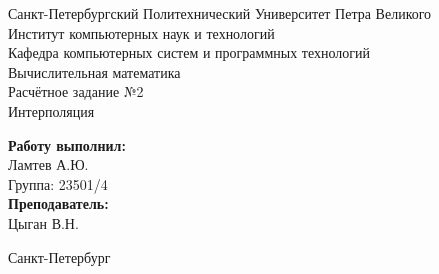 \begin{titlepage}	%

	\begin{center}		%

		\large Санкт-Петербургский Политехнический Университет Петра Великого\\
		\large Институт компьютерных наук и технологий \\
		\large Кафедра компьютерных систем и программных технологий\\[4cm]
		
		 \huge Вычислительная математика\\[0.3cm] %
		 \large Расчётное задание №2\\[0.1cm]
		 \large Интерполяция\\[8cm]

	\end{center}


	\begin{flushright} %
		\begin{minipage}{0.35\textwidth} %
			\begin{flushleft} %

				\large\textbf{Работу выполнил:}\\
				\large Ламтев А.Ю.\\
				\large {Группа:} 23501/4\\
				
				\large \textbf{Преподаватель:}\\
				\large Цыган В.Н.

			\end{flushleft}
		\end{minipage}
	\end{flushright}
	
	\vfill %

	\begin{center}
	\large Санкт-Петербург\\
	\large \the\year %
	\end{center} %

\thispagestyle{empty} %
\end{titlepage} %

\vfill %
